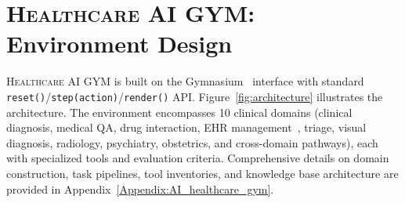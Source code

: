 \documentclass{article}
\newcommand{\gym}{\textsc{Healthcare AI GYM}}
\begin{document}
\section{\gym{}: Environment Design}
\label{sec:environment}

\gym{} is built on the Gymnasium~\citep{towers2024gymnasium} interface with standard \texttt{reset()}/\texttt{step(action)}/\texttt{render()} API. Figure~\ref{fig:architecture} illustrates the architecture. The environment encompasses 10 clinical domains (clinical diagnosis, medical QA, drug interaction, EHR management~\citep{johnson2016mimiciii, pollard2018eicu}, triage, visual diagnosis, radiology, psychiatry, obstetrics, and cross-domain pathways), each with specialized tools and evaluation criteria. Comprehensive details on domain construction, task pipelines, tool inventories, and knowledge base architecture are provided in Appendix~\ref{Appendix:AI_healthcare_gym}.
\end{document}
